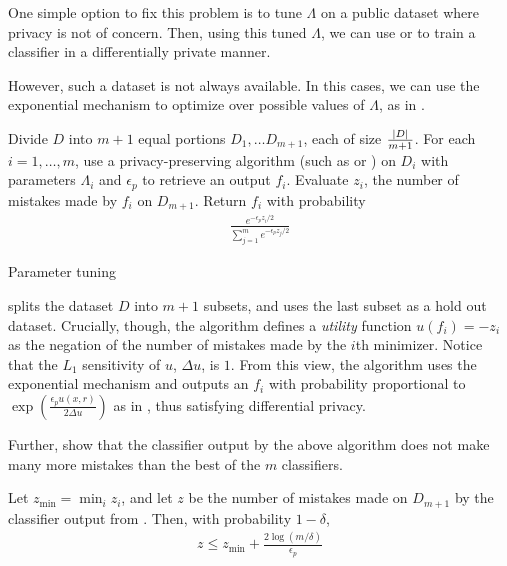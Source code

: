 \documentclass{article} %
\begin{document}
One simple option to fix this problem is to tune $\Lambda$ on a public dataset
where privacy is not of concern. Then, using this tuned $\Lambda$, we can use
 or  to train a classifier in a
differentially private manner.

However, such a dataset is not always available. In this cases, we can use the
exponential mechanism to optimize over possible values of $\Lambda$, as in
.

\begin{algorithm}[htb]
\begin{algorithmic}[1]
    \State Divide $D$ into $m + 1$ equal portions $D_1, \dots D_{m+1}$, each of
           size $\tfrac{\left\lvert D\right\rvert}{m + 1}$.
    \State For each $i = 1, \dots, m$, use a privacy-preserving algorithm
           (such as  or ) on
           $D_i$ with parameters $\Lambda_i$ and $\epsilon_p$ to retrieve an
           output $f_i$.
    \State Evaluate $z_i$, the number of mistakes made by $f_i$ on $D_{m+1}$.
    \State Return $f_i$ with probability
           \begin{align*}
           \frac{e^{-\epsilon_p z_i / 2}}{\sum_{j=1}^m e^{-\epsilon_p z_j / 2}}
           \end{align*}
   \EndFunction
\end{algorithmic}
\caption{Parameter tuning}\label{alg:parameter_tuning}
\end{algorithm}

 splits the dataset $D$ into $m+1$ subsets, and uses
the last subset as a hold out dataset. Crucially, though, the algorithm defines
a \textit{utility} function $u(f_i) = -z_i$ as the negation of the number of
mistakes made by the $i$th minimizer. Notice that the $L_1$ sensitivity of
$u$, $\Delta u$, is $1$.  From this view, the algorithm uses the exponential
mechanism and outputs an $f_i$ with probability proportional to
$\exp(\tfrac{\epsilon_p u(x, r)}{2 \Delta u})$ as in
, thus satisfying differential privacy.

Further, \cite{chaudhuri2011differentially} show that the classifier output by
the above algorithm does not make many more mistakes than the best of the $m$
classifiers.
\begin{theorem}
Let $z_{\text{min}} = \min_i z_i$, and let $z$ be the number of mistakes made on
$D_{m+1}$ by the classifier output from . Then, with
probability $1 - \delta$,
\begin{align*}
z \leq z_{\text{min}} + \frac{2 \log(m/\delta)}{\epsilon_p}
\end{align*}
\end{theorem}
\end{document}

